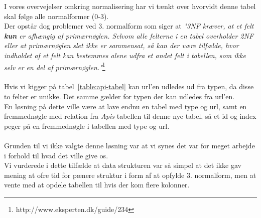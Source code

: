 I vores overvejelser omkring normalisering har vi tænkt over hvorvidt denne tabel skal følge alle normalformer (0-3).
\\
Der opstår dog problemer ved 3. normalform som siger at \textit{"3NF kræver, at et felt \textbf{kun} er afhængig af primærnøglen.
Selvom alle felterne i en tabel overholder 2NF eller at primærnøglen slet ikke er sammensat, så kan der være tilfælde, hvor indholdet af et felt kan bestemmes alene udfra et andet felt i tabellen, som ikke selv er en del af primærnøglen."}\footnote{http://www.eksperten.dk/guide/234}
\\\\
Hvis vi kigger på tabel~\ref{table:api-tabel} kan url'en udledes ud fra typen, da disse to felter er unikke. Det samme gælder for typen der kan udledes fra url'en.
\\
En løsning på dette ville være at lave endnu en tabel med type og url, samt en fremmednøgle med relation fra \textit{Apis} tabellen til denne nye tabel, så et id og index peger på en fremmednøgle i tabellen med type og url.
\\\\
Grunden til vi ikke valgte denne løsning var at vi synes det var for meget arbejde i forhold til hvad det ville give os.
\\
Vi vurderede i dette tilfælde at data strukturen var så simpel at det ikke gav mening at ofre tid for pænere struktur i form af at opfylde 3. normalform, men at vente med at opdele tabellen til hvis der kom flere kolonner.
